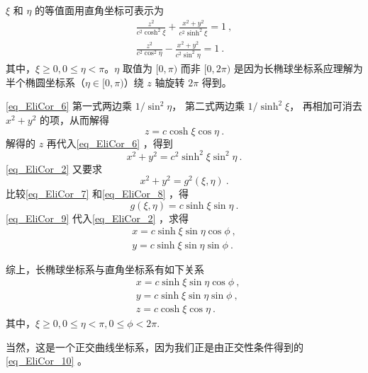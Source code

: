 $\xi$ 和 $\eta$ 的等值面用直角坐标可表示为
\begin{equation}\label{eq_EliCor_6}
\begin{aligned}
\frac{z^2}{c^2\cosh^2\xi}+\frac{x^2+y^2}{c^2\sinh^2\xi}=1~,\\
\frac{z^2}{c^2\cos^2\eta}-\frac{x^2+y^2}{c^2\sin^2\eta}=1~.
\end{aligned}
\end{equation}
其中，$\xi\geq 0,0\leq\eta<\pi$。$\eta$ 取值为 $[0,\pi)$ 而非 $[0,2\pi)$ 是因为长椭球坐标系应理解为半个椭圆坐标系（$\eta\in[0,\pi)$）绕 $z$ 轴旋转 $2\pi$ 得到。

\autoref{eq_EliCor_6} 第一式两边乘 $1/\sin^2\eta$， 第二式两边乘 $1/\sinh^2\xi$， 再相加可消去 $x^2+y^2$ 的项，从而解得
\begin{equation}
z=c\cosh\xi\cos\eta~.
\end{equation}
解得的 $z$ 再代入\autoref{eq_EliCor_6} ，得到
\begin{equation}\label{eq_EliCor_7}
x^2+y^2=c^2\sinh^2\xi\sin^2\eta~.
\end{equation}
\autoref{eq_EliCor_2} 又要求
\begin{equation}\label{eq_EliCor_8}
x^2+y^2=g^2(\xi,\eta)~.
\end{equation}
比较\autoref{eq_EliCor_7} 和\autoref{eq_EliCor_8} ，得
\begin{equation}\label{eq_EliCor_9}
g(\xi,\eta)=c\sinh\xi\sin\eta~.
\end{equation}
\autoref{eq_EliCor_9} 代入\autoref{eq_EliCor_2} ，求得
\begin{equation}
\begin{aligned}
x=c\sinh\xi\sin\eta\cos\phi~,\\
y=c\sinh\xi\sin\eta\sin\phi~.
\end{aligned}
\end{equation}

综上，长椭球坐标系与直角坐标系有如下关系
\begin{equation}\label{eq_EliCor_10}
\begin{aligned}
&x=c\sinh\xi\sin\eta\cos\phi~,\\
&y=c\sinh\xi\sin\eta\sin\phi~,\\
&z=c\cosh\xi\cos\eta~.
\end{aligned}
\end{equation}
其中，$\xi\geq 0,0\leq\eta<\pi,0\leq\phi<2\pi$.

当然，这是一个正交曲线坐标系，因为我们正是由正交性条件得到的\autoref{eq_EliCor_10} 。

